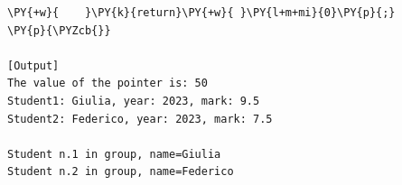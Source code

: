 \begin{Verbatim}[label=\makebox{\url{https://github.com/lucabaldini/cmepda/tree/master/slides/latex/snippets/typedef_and_structs.c}},commandchars=\\\{\}]
\PY{+w}{    }\PY{k}{return}\PY{+w}{ }\PY{l+m+mi}{0}\PY{p}{;}
\PY{p}{\PYZcb{}}

[Output]
The value of the pointer is: 50
Student1: Giulia, year: 2023, mark: 9.5
Student2: Federico, year: 2023, mark: 7.5

Student n.1 in group, name=Giulia
Student n.2 in group, name=Federico
\end{Verbatim}